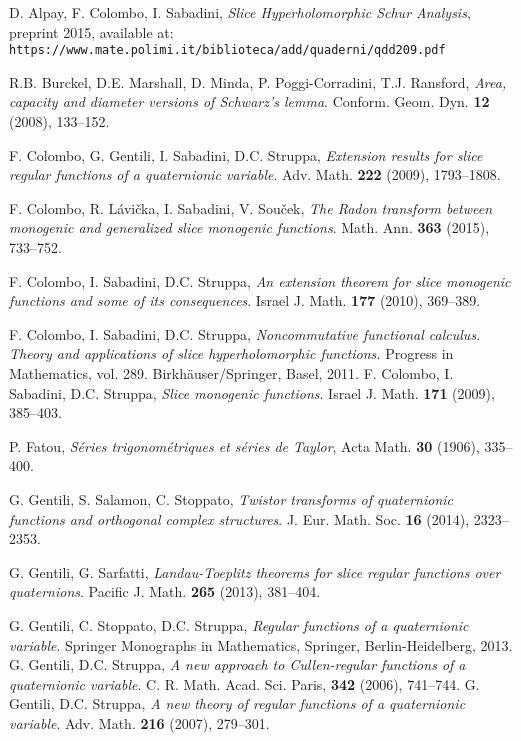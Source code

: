 \documentclass{amsart}
\theoremstyle{definition}
\theoremstyle{remark}
\numberwithin{equation}{section}
\begin{document}

\begin{thebibliography}{99}
 D. Alpay, F. Colombo, I. Sabadini, \textit{Slice Hyperholomorphic Schur Analysis}, preprint 2015, available at: \verb"https://www.mate.polimi.it/biblioteca/add/quaderni/qdd209.pdf"

 R.B. Burckel, D.E. Marshall, D. Minda, P. Poggi-Corradini, T.J. Ransford, \textit{Area, capacity and diameter versions of Schwarz's lemma}. Conform. Geom. Dyn. \textbf{12} (2008), 133--152.

 F. Colombo, G. Gentili, I. Sabadini, D.C. Struppa, \textit{Extension results for slice regular functions of a quaternionic variable}. Adv. Math. \textbf{222} (2009), 1793--1808.

 F. Colombo, R. L\'{a}vi\v{c}ka, I. Sabadini, V. Sou\v{c}ek, \textit{The Radon transform between monogenic and generalized slice monogenic functions}. Math. Ann. \textbf{363 } (2015),   733--752.
    
 F. Colombo, I. Sabadini, D.C. Struppa,\textit{ An extension theorem for slice monogenic functions and some of its consequences}. Israel J. Math. \textbf{177} (2010), 369--389.

 F. Colombo, I. Sabadini, D.C. Struppa, \textit{Noncommutative functional calculus. Theory and applications of slice hyperholomorphic functions.} Progress in Mathematics, vol. 289. Birkh\"auser/Springer, Basel, 2011.
 F. Colombo, I. Sabadini, D.C. Struppa, \textit{Slice monogenic functions}. Israel J. Math. \textbf{171} (2009), 385--403.

 P. Fatou, \textit{S\'{e}ries trigonom\'{e}triques et s\'{e}ries de Taylor}, Acta Math. \textbf{30} (1906), 335--400.

 G. Gentili, S. Salamon, C. Stoppato, \textit{Twistor transforms of quaternionic functions and orthogonal complex structures}. J. Eur. Math. Soc. \textbf{16} (2014),  2323--2353.

 G. Gentili, G. Sarfatti, \textit{Landau-Toeplitz theorems for slice regular functions over quaternions}. Pacific J. Math. \textbf{265} (2013),  381--404.

 G. Gentili, C. Stoppato, D.C. Struppa, \textit{Regular functions of a quaternionic variable}. Springer Monographs in Mathematics, Springer, Berlin-Heidelberg, 2013.
 G. Gentili, D.C. Struppa,\textit{ A new approach to Cullen-regular functions of a quaternionic variable}. C. R. Math. Acad. Sci. Paris, \textbf{342}  (2006), 741--744.
 G. Gentili, D.C. Struppa, \textit{A new theory of regular functions of a quaternionic variable}. Adv. Math.  \textbf{216}  (2007), 279--301.


\end{thebibliography}
\end{document}
